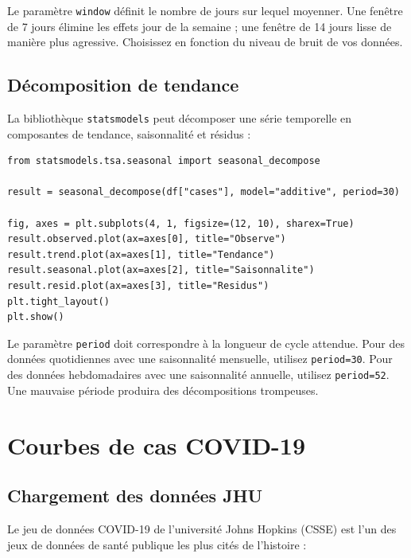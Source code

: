 \begin{pythontip}
Le param\`etre \texttt{window} d\'efinit le nombre de jours sur lequel moyenner. Une fen\^etre de 7 jours \'elimine les effets jour de la semaine ; une fen\^etre de 14 jours lisse de mani\`ere plus agressive. Choisissez en fonction du niveau de bruit de vos donn\'ees.
\end{pythontip}

\subsection{D\'ecomposition de tendance}

La biblioth\`eque \texttt{statsmodels} peut d\'ecomposer une s\'erie temporelle en composantes de tendance, saisonnalit\'e et r\'esidus :

\begin{verbatim}
from statsmodels.tsa.seasonal import seasonal_decompose

result = seasonal_decompose(df["cases"], model="additive", period=30)

fig, axes = plt.subplots(4, 1, figsize=(12, 10), sharex=True)
result.observed.plot(ax=axes[0], title="Observe")
result.trend.plot(ax=axes[1], title="Tendance")
result.seasonal.plot(ax=axes[2], title="Saisonnalite")
result.resid.plot(ax=axes[3], title="Residus")
plt.tight_layout()
plt.show()
\end{verbatim}

\begin{warningbox}
Le param\`etre \texttt{period} doit correspondre \`a la longueur de cycle attendue. Pour des donn\'ees quotidiennes avec une saisonnalit\'e mensuelle, utilisez \texttt{period=30}. Pour des donn\'ees hebdomadaires avec une saisonnalit\'e annuelle, utilisez \texttt{period=52}. Une mauvaise p\'eriode produira des d\'ecompositions trompeuses.
\end{warningbox}

\section{Courbes de cas COVID-19}

\subsection{Chargement des donn\'ees JHU}

Le jeu de donn\'ees COVID-19 de l'universit\'e Johns Hopkins (CSSE) est l'un des jeux de donn\'ees de sant\'e publique les plus cit\'es de l'histoire :

